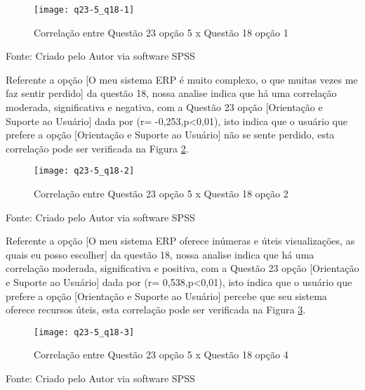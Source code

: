 \begin{figure}[H]
	\centering	
	\caption{Correlação entre Questão 23 opção 5 x Questão 18 opção 1}
	\texttt{[image: q23-5\_q18-1]}
	\label{fig:figura-q235_q181}
\end{figure}
\vspace{-0.8 cm} \hspace{1.45 cm} Fonte: Criado pelo Autor via software SPSS\newline

\indent Referente a opção [O meu sistema ERP é muito complexo, o que muitas vezes me faz sentir perdido] da questão 18, nossa analise indica que há uma correlação moderada, significativa e negativa, com a Questão 23 opção [Orientação e Suporte ao Usuário] dada por (r= -0,253,p<0,01), isto indica que o usuário que prefere a opção [Orientação e Suporte ao Usuário] não se sente perdido, esta correlação pode ser verificada na Figura \ref{fig:figura-q235_q182}.\newline

\begin{figure}[H]
	\centering	
	\caption{Correlação entre Questão 23 opção 5 x Questão 18 opção 2}
	\texttt{[image: q23-5\_q18-2]}
	\label{fig:figura-q235_q182}
\end{figure}
\vspace{-0.8 cm} \hspace{1.45 cm} Fonte: Criado pelo Autor via software SPSS\newline

\indent Referente a opção [O meu sistema ERP oferece inúmeras e úteis visualizações, as quais eu posso escolher] da questão 18, nossa analise indica que há uma correlação moderada, significativa e positiva, com a Questão 23 opção [Orientação e Suporte ao Usuário] dada por (r= 0,538,p<0,01), isto indica que o usuário que prefere a opção [Orientação e Suporte ao Usuário] percebe que seu sistema oferece recursos úteis, esta correlação pode ser verificada na Figura \ref{fig:figura-q235_q183}.\newline

\begin{figure}[H]
	\centering	
	\caption{Correlação entre Questão 23 opção 5 x Questão 18 opção 4}
	\texttt{[image: q23-5\_q18-3]}
	\label{fig:figura-q235_q183}
\end{figure}
\vspace{-0.8 cm} \hspace{1.45 cm} Fonte: Criado pelo Autor via software SPSS\newline

